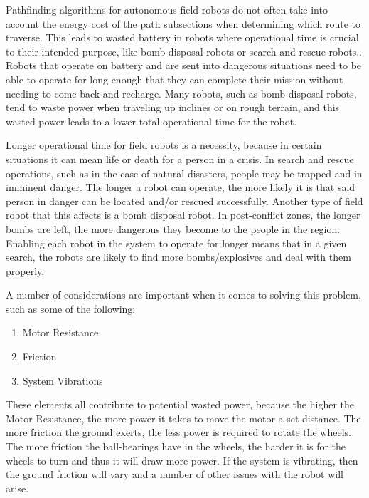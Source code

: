 Pathfinding algorithms for autonomous field robots do not often take into account the energy cost of the path subsections when determining which route to traverse. This leads to wasted battery in robots where operational time is crucial to their intended purpose, like bomb disposal robots or search and rescue robots.\cite{henkel2016energy}. Robots that operate on battery and are sent into dangerous situations need to be able to operate for long enough that they can complete their mission without needing to come back and recharge. Many robots, such as bomb disposal robots, tend to waste power when traveling up inclines or on rough terrain, and this wasted power leads to a lower total operational time for the robot\cite{dasgupta2015comrade}.
\par
Longer operational time for field robots is a necessity, because in certain situations it can mean life or death for a person in a crisis. In search and rescue operations, such as in the case of natural disasters, people may be trapped and in imminent danger. The longer a robot can operate, the more likely it is that said person in danger can be located and/or rescued successfully. Another type of field robot that this affects is a bomb disposal robot. In post-conflict zones, the longer bombs are left, the more dangerous they become to the people in the region. Enabling each robot in the system to operate for longer means that in a given search, the robots are likely to find more bombs/explosives and deal with them properly\cite{dasgupta2015comrade}.
\par
A number of considerations are important when it comes to solving this problem, such as some of the following\cite{henkel2016energy}:
\begin{enumerate}
    \item Motor Resistance
    \item Friction
    \item System Vibrations
\end{enumerate}
\par
These elements all contribute to potential wasted power, because the higher the Motor Resistance, the more power it takes to move the motor a set distance. The more friction the ground exerts, the less power is required to rotate the wheels. The more friction the ball-bearings have in the wheels, the harder it is for the wheels to turn and thus it will draw more power. If the system is vibrating, then the ground friction will vary and a number of other issues with the robot will arise\cite{henkel2016energy}.

